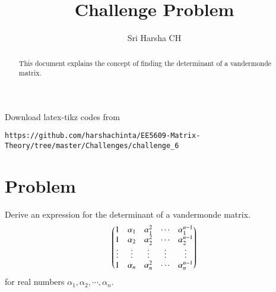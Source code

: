 \documentclass[journal,12pt,twocolumn]{IEEEtran}
\begin{document}
\renewcommand{\thefigure}{\theproblem}

\def\putbox#1#2#3{\makebox[0in][l]{\makebox[#1][l]{}\raisebox{\baselineskip}[0in][0in]{\raisebox{#2}[0in][0in]{#3}}}}
     \def\rightbox#1{\makebox[0in][r]{#1}}
     \def\centbox#1{\makebox[0in]{#1}}
     \def\topbox#1{\raisebox{-\baselineskip}[0in][0in]{#1}}
     \def\midbox#1{\raisebox{-0.5\baselineskip}[0in][0in]{#1}}
\vspace{3cm}
\title{Challenge Problem}
\author{Sri Harsha CH}

\maketitle
\newpage

\bigskip
\renewcommand{\thefigure}{\theenumi}
\renewcommand{\thetable}{\theenumi}

\begin{abstract}
This document explains the concept of finding the determinant of a vandermonde matrix.
\end{abstract}
Download latex-tikz codes from 
%
\begin{lstlisting}
https://github.com/harshachinta/EE5609-Matrix-Theory/tree/master/Challenges/challenge_6
\end{lstlisting}
%
\section{Problem}
Derive an expression for the determinant of a vandermonde matrix.
\begin{align}
    \begin{pmatrix}1&\alpha_1&\alpha_1^2&\cdots&\alpha_1^{n-1}\\1&\alpha_2&\alpha_2^2&\cdots&\alpha_2^{n-1}\\\vdots&\vdots&\vdots&\vdots&\vdots\\1&\alpha_n&\alpha_n^2&\cdots&\alpha_n^{n-1}\end{pmatrix}
\end{align}
for real numbers $\alpha_1,\alpha_2,\cdots,\alpha_n$.
\end{document}
